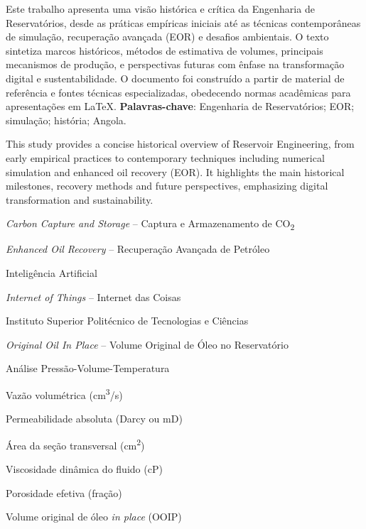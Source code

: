 \documentclass[12pt,a4paper,oneside,brazilian,sumario=tradicional]{abntex2}
\begin{document}
\setlength{\absparsep}{18pt}
\begin{resumo}
Este trabalho apresenta uma visão histórica e crítica da Engenharia de
Reservatórios, desde as práticas empíricas iniciais até as técnicas
contemporâneas de simulação, recuperação avançada (EOR) e desafios
ambientais. O texto sintetiza marcos históricos, métodos de estimativa de
volumes, principais mecanismos de produção, e perspectivas futuras com
ênfase na transformação digital e sustentabilidade. O documento foi
construído a partir de material de referência e fontes técnicas
especializadas, obedecendo normas acadêmicas para apresentações em LaTeX.
\vspace{6pt}
\noindent\textbf{Palavras-chave}: Engenharia de Reservatórios; EOR; simulação; história; Angola.
\end{resumo}

\begin{resumo}[Abstract]
This study provides a concise historical overview of Reservoir Engineering,
from early empirical practices to contemporary techniques including
numerical simulation and enhanced oil recovery (EOR). It highlights the main
historical milestones, recovery methods and future perspectives, emphasizing
digital transformation and sustainability.
\end{resumo}

\listoffigures*
\cleardoublepage

\listoftables*
\cleardoublepage

\begin{siglas}
  \item[CCS]    \textit{Carbon Capture and Storage} -- Captura e Armazenamento de CO\textsubscript{2}
  \item[EOR]    \textit{Enhanced Oil Recovery} -- Recuperação Avançada de Petróleo
  \item[IA]     Inteligência Artificial
  \item[IoT]    \textit{Internet of Things} -- Internet das Coisas
  \item[ISPTEC] Instituto Superior Politécnico de Tecnologias e Ciências
  \item[OOIP]   \textit{Original Oil In Place} -- Volume Original de Óleo no Reservatório
  \item[PVT]    Análise Pressão-Volume-Temperatura
\end{siglas}

\begin{simbolos}
  \item[$q$] Vazão volumétrica (cm\textsuperscript{3}/s)
  \item[$k$] Permeabilidade absoluta (Darcy ou mD)
  \item[$A$] Área da seção transversal (cm\textsuperscript{2})
  \item[$\mu$] Viscosidade dinâmica do fluido (cP)
  \item[$\phi$] Porosidade efetiva (fração)
  \item[$N$] Volume original de óleo \textit{in place} (OOIP)
\end{simbolos}
\end{document}
